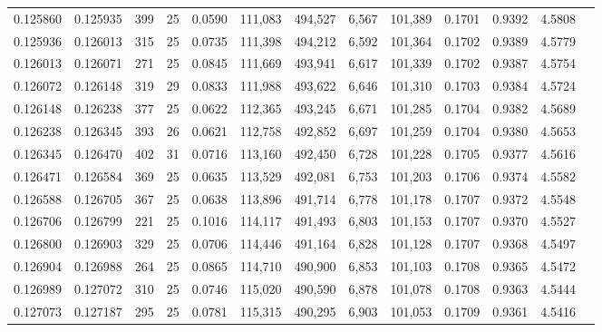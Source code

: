 \begin{tabular}{rrrrrrrrrrrrr}
0.125860 & 0.125935 & 399 &  25 &                                     0.0590 & 111,083 & 494,527 &   6,567 & 101,389 & 0.1701 & 0.9392 & 4.5808 \\
0.125936 & 0.126013 & 315 &  25 &                                     0.0735 & 111,398 & 494,212 &   6,592 & 101,364 & 0.1702 & 0.9389 & 4.5779 \\
0.126013 & 0.126071 & 271 &  25 &                                     0.0845 & 111,669 & 493,941 &   6,617 & 101,339 & 0.1702 & 0.9387 & 4.5754 \\
0.126072 & 0.126148 & 319 &  29 &                                     0.0833 & 111,988 & 493,622 &   6,646 & 101,310 & 0.1703 & 0.9384 & 4.5724 \\
0.126148 & 0.126238 & 377 &  25 &                                     0.0622 & 112,365 & 493,245 &   6,671 & 101,285 & 0.1704 & 0.9382 & 4.5689 \\
0.126238 & 0.126345 & 393 &  26 &                                     0.0621 & 112,758 & 492,852 &   6,697 & 101,259 & 0.1704 & 0.9380 & 4.5653 \\
0.126345 & 0.126470 & 402 &  31 &                                     0.0716 & 113,160 & 492,450 &   6,728 & 101,228 & 0.1705 & 0.9377 & 4.5616 \\
0.126471 & 0.126584 & 369 &  25 &                                     0.0635 & 113,529 & 492,081 &   6,753 & 101,203 & 0.1706 & 0.9374 & 4.5582 \\
0.126588 & 0.126705 & 367 &  25 &                                     0.0638 & 113,896 & 491,714 &   6,778 & 101,178 & 0.1707 & 0.9372 & 4.5548 \\
0.126706 & 0.126799 & 221 &  25 &                                     0.1016 & 114,117 & 491,493 &   6,803 & 101,153 & 0.1707 & 0.9370 & 4.5527 \\
0.126800 & 0.126903 & 329 &  25 &                                     0.0706 & 114,446 & 491,164 &   6,828 & 101,128 & 0.1707 & 0.9368 & 4.5497 \\
0.126904 & 0.126988 & 264 &  25 &                                     0.0865 & 114,710 & 490,900 &   6,853 & 101,103 & 0.1708 & 0.9365 & 4.5472 \\
0.126989 & 0.127072 & 310 &  25 &                                     0.0746 & 115,020 & 490,590 &   6,878 & 101,078 & 0.1708 & 0.9363 & 4.5444 \\
0.127073 & 0.127187 & 295 &  25 &                                     0.0781 & 115,315 & 490,295 &   6,903 & 101,053 & 0.1709 & 0.9361 & 4.5416 \\

\end{tabular}
